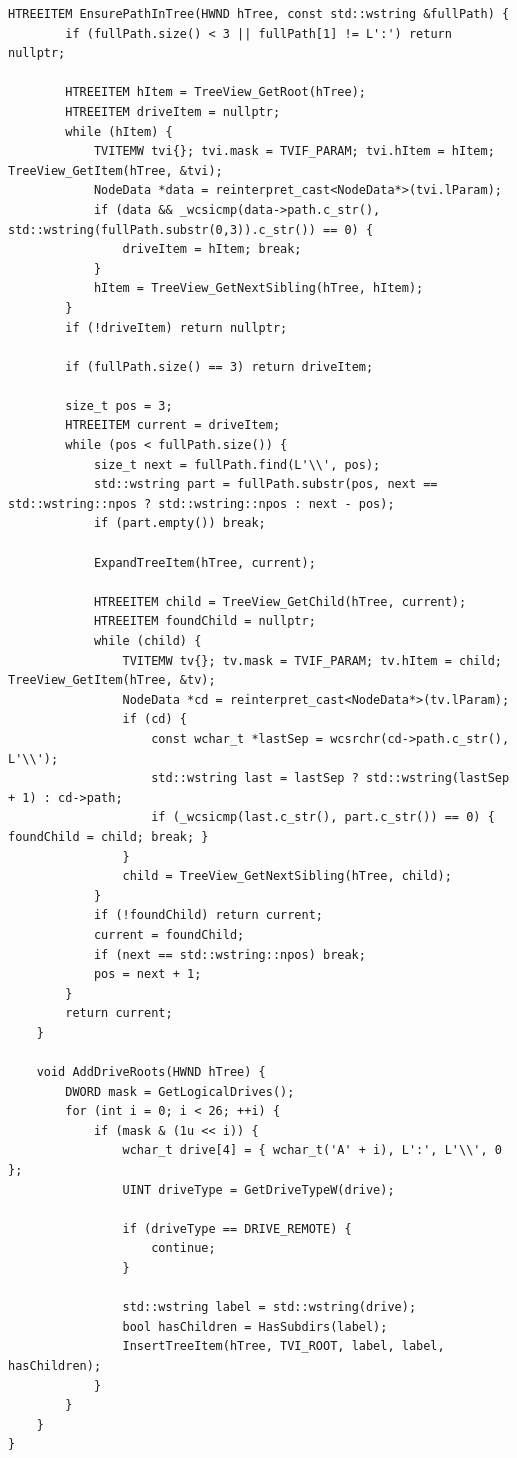 \begin{lstlisting}[style=CodeListing]
    HTREEITEM EnsurePathInTree(HWND hTree, const std::wstring &fullPath) {
        if (fullPath.size() < 3 || fullPath[1] != L':') return nullptr;
        
        HTREEITEM hItem = TreeView_GetRoot(hTree);
        HTREEITEM driveItem = nullptr;
        while (hItem) {
            TVITEMW tvi{}; tvi.mask = TVIF_PARAM; tvi.hItem = hItem; TreeView_GetItem(hTree, &tvi);
            NodeData *data = reinterpret_cast<NodeData*>(tvi.lParam);
            if (data && _wcsicmp(data->path.c_str(), std::wstring(fullPath.substr(0,3)).c_str()) == 0) {
                driveItem = hItem; break;
            }
            hItem = TreeView_GetNextSibling(hTree, hItem);
        }
        if (!driveItem) return nullptr;

        if (fullPath.size() == 3) return driveItem;

        size_t pos = 3;
        HTREEITEM current = driveItem;
        while (pos < fullPath.size()) {
            size_t next = fullPath.find(L'\\', pos);
            std::wstring part = fullPath.substr(pos, next == std::wstring::npos ? std::wstring::npos : next - pos);
            if (part.empty()) break;

            ExpandTreeItem(hTree, current);

            HTREEITEM child = TreeView_GetChild(hTree, current);
            HTREEITEM foundChild = nullptr;
            while (child) {
                TVITEMW tv{}; tv.mask = TVIF_PARAM; tv.hItem = child; TreeView_GetItem(hTree, &tv);
                NodeData *cd = reinterpret_cast<NodeData*>(tv.lParam);
                if (cd) {
                    const wchar_t *lastSep = wcsrchr(cd->path.c_str(), L'\\');
                    std::wstring last = lastSep ? std::wstring(lastSep + 1) : cd->path;
                    if (_wcsicmp(last.c_str(), part.c_str()) == 0) { foundChild = child; break; }
                }
                child = TreeView_GetNextSibling(hTree, child);
            }
            if (!foundChild) return current;
            current = foundChild;
            if (next == std::wstring::npos) break;
            pos = next + 1;
        }
        return current;
    }
    
    void AddDriveRoots(HWND hTree) {
        DWORD mask = GetLogicalDrives();
        for (int i = 0; i < 26; ++i) {
            if (mask & (1u << i)) {
                wchar_t drive[4] = { wchar_t('A' + i), L':', L'\\', 0 };
                UINT driveType = GetDriveTypeW(drive);
                
                if (driveType == DRIVE_REMOTE) {
                    continue;
                }
                
                std::wstring label = std::wstring(drive);
                bool hasChildren = HasSubdirs(label);
                InsertTreeItem(hTree, TVI_ROOT, label, label, hasChildren);
            }
        }
    }
}
\end{lstlisting}


